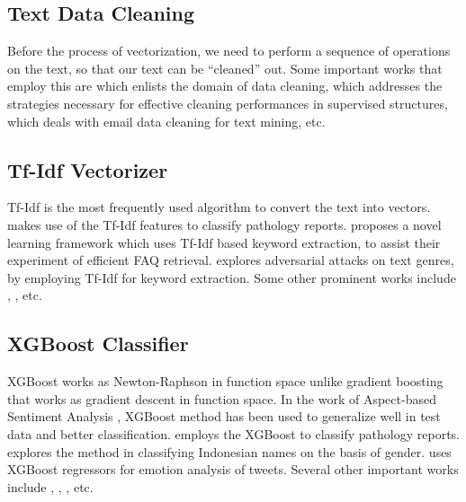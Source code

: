\documentclass[conference]{IEEEtran}
\begin{document}
\subsection{Text Data Cleaning}
Before the process of vectorization, we need to perform a sequence of operations on the text, so that our text can be “cleaned” out. Some important works that employ this are \cite{rahm2000data} which enlists the domain of data cleaning, \cite{esuli2009training} which addresses the strategies necessary for effective cleaning performances in supervised structures, \cite{tang2005email} which deals with email data cleaning for text mining, etc.

\subsection{Tf-Idf Vectorizer}
Tf-Idf is the most frequently used algorithm to convert the text into vectors.
\cite{kalra2019automatic} makes use of the Tf-Idf features to classify pathology reports. 
\cite{dutta2021sequencetosequence} proposes a novel learning framework which uses Tf-Idf based keyword extraction, to assist their experiment of efficient FAQ retrieval. \cite{lepekhin2021experiments} explores adversarial attacks on text genres, by employing Tf-Idf for keyword extraction. 
Some other prominent works include
\cite{fattahi2020spaml}, 
\cite{ma2020xtqa}, etc.

\subsection{XGBoost Classifier}
XGBoost works as Newton-Raphson in function space unlike gradient boosting that works as gradient descent in function space. In the work of Aspect-based Sentiment Analysis \cite{azhar2021finetuning}, XGBoost method has been used to generalize well in test data and better classification.
\cite{kalra2019automatic} employs the XGBoost to classify pathology reports.
\cite{septiandri2017predicting} explores the method in classifying Indonesian names on the basis of gender.
\cite{jabreel2018eitaka} uses XGBoost regressors for emotion analysis of tweets. Several other important works include 
\cite{collender2020machinelearning}, 
\cite{tassone2020utilizing}, 
\cite{gaman2020combining}, etc.
\end{document}
